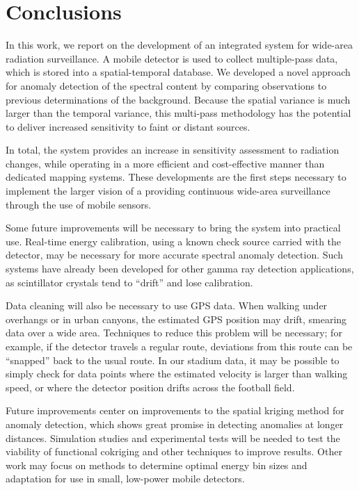 \chapter{Conclusions}

In this work, we report on the development of an integrated system for wide-area
radiation surveillance.  A mobile detector is used to collect multiple-pass
data, which is stored into a spatial-temporal database.  We developed a novel
approach for anomaly detection of the spectral content by comparing observations
to previous determinations of the background.  Because the spatial variance is
much larger than the temporal variance, this multi-pass methodology has the
potential to deliver increased sensitivity to faint or distant sources.

In total, the system provides an increase in sensitivity assessment to radiation
changes, while operating in a more efficient and cost-effective manner than
dedicated mapping systems.  These developments are the first steps necessary to
implement the larger vision of a providing continuous wide-area surveillance
through the use of mobile sensors.

Some future improvements will be necessary to bring the system into practical
use. Real-time energy calibration, using a known check source carried with the
detector, may be necessary for more accurate spectral anomaly detection. Such
systems have already been developed for other gamma ray detection applications,
as scintillator crystals tend to ``drift'' and lose
calibration.\cite{Runkle:2009ev}

Data cleaning will also be necessary to use GPS data. When walking under
overhangs or in urban canyons, the estimated GPS position may drift, smearing
data over a wide area. Techniques to reduce this problem will be necessary; for
example, if the detector travels a regular route, deviations from this route
can be ``snapped'' back to the usual route. In our stadium data, it may be
possible to simply check for data points where the estimated velocity is larger
than walking speed, or where the detector position drifts across the football
field.

Future improvements center on improvements to the spatial kriging method for
anomaly detection, which shows great promise in detecting anomalies at longer
distances. Simulation studies and experimental tests will be needed to test the
viability of functional cokriging and other techniques to improve results. Other
work may focus on methods to determine optimal energy bin sizes and adaptation
for use in small, low-power mobile detectors.

